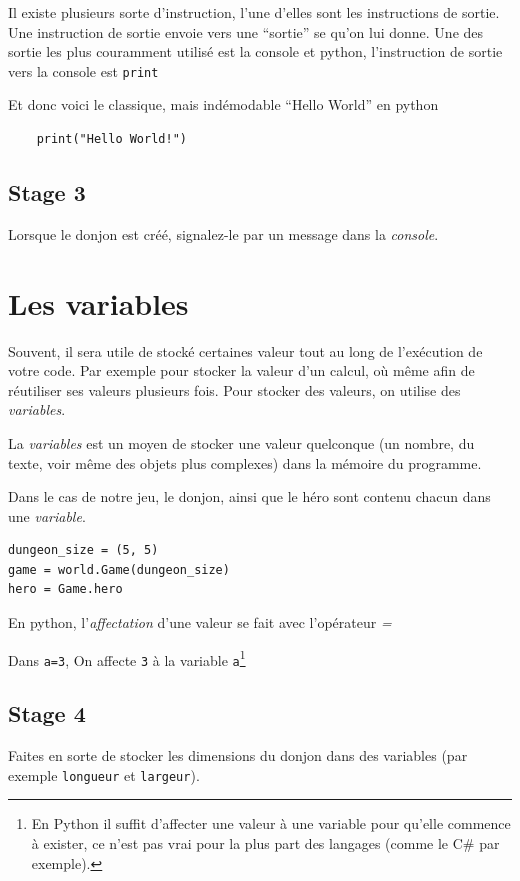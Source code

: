 \documentclass[12pt,a4paper]{report}
\newcommand{\codeintext}[1]{\texttt{#1}}
\begin{document}
Il existe plusieurs sorte d’instruction, l’une d’elles sont les instructions de sortie.
Une instruction de sortie envoie vers une “sortie” se qu’on lui donne.
Une des sortie les plus couramment utilisé est la console et python, l’instruction de sortie vers la console est \codeintext{print}

Et donc voici le classique, mais indémodable “Hello World” en python

\begin{lstlisting}
    print("Hello World!")
\end{lstlisting}


\subsection{Stage 3}
Lorsque le donjon est créé, signalez-le par un message dans la \emph{console}.

\section{Les variables}

Souvent, il sera utile de stocké certaines valeur tout au long de l’exécution de votre code.
Par exemple pour stocker la valeur d’un calcul, où même afin de réutiliser ses valeurs plusieurs fois. Pour stocker des valeurs, on utilise des \emph{variables}.

La \emph{variables} est un moyen de stocker une valeur quelconque (un nombre, du texte, voir même des objets plus complexes) dans la mémoire du programme.

Dans le cas de notre jeu, le donjon, ainsi que le héro sont contenu chacun dans une \emph{variable}.

\begin{lstlisting}
dungeon_size = (5, 5)
game = world.Game(dungeon_size)
hero = Game.hero
\end{lstlisting}

En python, l’\emph{affectation} d’une valeur se fait avec l’opérateur \emph{=}

Dans \codeintext{a=3}, On affecte \codeintext{3} à la variable \codeintext{a}\footnote{ En Python il suffit d’affecter une valeur à une variable pour qu’elle commence à exister, ce n’est pas vrai pour la plus part des langages (comme le C\# par exemple).}

\subsection{Stage 4}
Faites en sorte de stocker les dimensions du donjon dans des variables (par exemple \codeintext{longueur} et \codeintext{largeur}).
\end{document}
